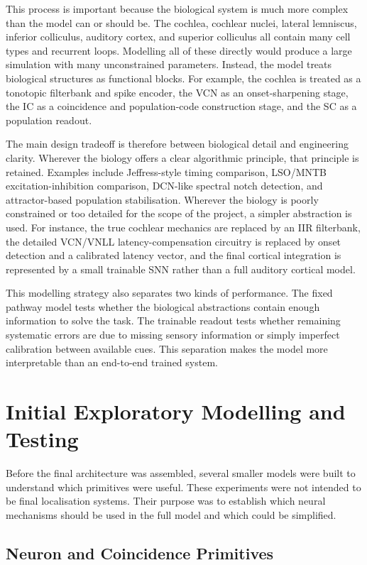 This process is important because the biological system is much more complex than the model can or should be. The cochlea, cochlear nuclei, lateral lemniscus, inferior colliculus, auditory cortex, and superior colliculus all contain many cell types and recurrent loops. Modelling all of these directly would produce a large simulation with many unconstrained parameters. Instead, the model treats biological structures as functional blocks. For example, the cochlea is treated as a tonotopic filterbank and spike encoder, the VCN as an onset-sharpening stage, the IC as a coincidence and population-code construction stage, and the SC as a population readout.

The main design tradeoff is therefore between biological detail and engineering clarity. Wherever the biology offers a clear algorithmic principle, that principle is retained. Examples include Jeffress-style timing comparison, LSO/MNTB excitation-inhibition comparison, DCN-like spectral notch detection, and attractor-based population stabilisation. Wherever the biology is poorly constrained or too detailed for the scope of the project, a simpler abstraction is used. For instance, the true cochlear mechanics are replaced by an IIR filterbank, the detailed VCN/VNLL latency-compensation circuitry is replaced by onset detection and a calibrated latency vector, and the final cortical integration is represented by a small trainable SNN rather than a full auditory cortical model.

This modelling strategy also separates two kinds of performance. The fixed pathway model tests whether the biological abstractions contain enough information to solve the task. The trainable readout tests whether remaining systematic errors are due to missing sensory information or simply imperfect calibration between available cues. This separation makes the model more interpretable than an end-to-end trained system.

\section{Initial Exploratory Modelling and Testing}

Before the final architecture was assembled, several smaller models were built to understand which primitives were useful. These experiments were not intended to be final localisation systems. Their purpose was to establish which neural mechanisms should be used in the full model and which could be simplified.

\subsection{Neuron and Coincidence Primitives}

